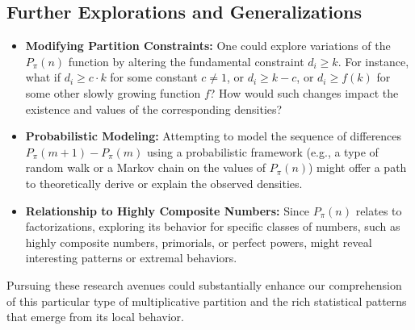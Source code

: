\documentclass[]{article}
\theoremstyle{plain}%
\theoremstyle{definition}
\theoremstyle{remark}
\begin{document}
\subsection{Further Explorations and Generalizations}
\begin{itemize}
	\item \textbf{Modifying Partition Constraints:} One could explore variations of the $P_{\pi}(n)$ function by altering the fundamental constraint $d_i \ge k$. For instance, what if $d_i \ge c \cdot k$ for some constant $c \neq 1$, or $d_i \ge k-c$, or $d_i \ge f(k)$ for some other slowly growing function $f$? How would such changes impact the existence and values of the corresponding densities?
	\item \textbf{Probabilistic Modeling:} Attempting to model the sequence of differences $P_{\pi}(m+1) - P_{\pi}(m)$ using a probabilistic framework (e.g., a type of random walk or a Markov chain on the values of $P_{\pi}(n)$) might offer a path to theoretically derive or explain the observed densities.
	\item \textbf{Relationship to Highly Composite Numbers:} Since $P_{\pi}(n)$ relates to factorizations, exploring its behavior for specific classes of numbers, such as highly composite numbers, primorials, or perfect powers, might reveal interesting patterns or extremal behaviors.
\end{itemize}

Pursuing these research avenues could substantially enhance our comprehension of this particular type of multiplicative partition and the rich statistical patterns that emerge from its local behavior.
\end{document}
